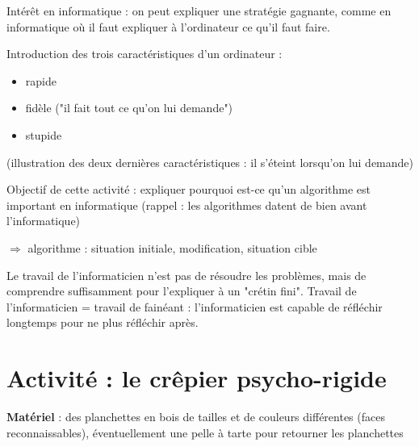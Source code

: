 \documentclass[a4paper]{article}
\newcommand{\titre}[1]{\medskip\noindent\textbf{#1} : }
\newcommand{\materiel}{\titre{Matériel}}
\begin{document}
Intérêt en informatique : on peut expliquer une stratégie gagnante, comme en informatique où il faut expliquer à l'ordinateur ce qu'il faut faire.

Introduction des trois caractéristiques d'un ordinateur :
\begin{itemize}
\item rapide
\item fidèle ("il fait tout ce qu'on lui demande")
\item stupide
\end{itemize}
(illustration des deux dernières caractéristiques : il s'éteint lorsqu'on lui demande)

Objectif de cette activité : expliquer pourquoi est-ce qu'un algorithme est important en informatique (rappel : les algorithmes datent de bien avant l'informatique)

$\Rightarrow$ algorithme : situation initiale, modification, situation cible

Le travail de l'informaticien n'est pas de résoudre les problèmes, mais de comprendre suffisamment pour l'expliquer à un "crétin fini".
Travail de l'informaticien = travail de fainéant : l'informaticien est capable de réfléchir longtemps pour ne plus réfléchir après.




\section{Activité : le crêpier psycho-rigide}
\materiel des planchettes en bois de tailles et de couleurs différentes (faces reconnaissables), éventuellement une pelle à tarte pour retourner les planchettes
\end{document}
